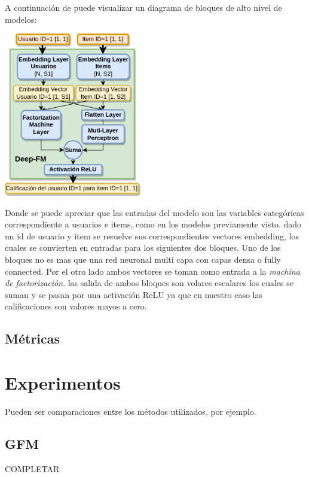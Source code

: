\documentclass[11pt,a4paper,twoside]{thesis}
\begin{document}
A continuación de puede visualizar un diagrama de bloques de alto nivel de modelos:

\begin{center}
	\includegraphics[width=6cm]{./images/Deep-MF.png}
\end{center}

Donde se puede apreciar que las entradas del modelo son las variables categóricas correspondiente a usuarios e items, como en los modelos previamente visto.
dado un id de usuario y item se resuelve sus correspondientes vectores embedding, los cuales se convierten en entradas para los siguientes dos bloques. Uno de los bloques no es mas que una red neuronal multi capa con capas densa o fully connected. Por el otro lado ambos vectores se toman como entrada a la \textit{machina de factorización}. las salida de ambos bloques son volares escalares los cuales se suman y se pasan por una activación ReLU ya que en nuestro caso las calificaciones son valores mayos a cero.


\section{Métricas}

\chapter{Experimentos}
Pueden ser comparaciones entre los métodos utilizados, por ejemplo. 


\section{GFM}

COMPLETAR
\end{document}
